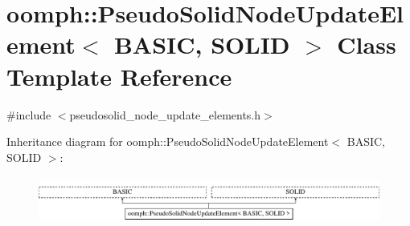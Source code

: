 \hypertarget{classoomph_1_1PseudoSolidNodeUpdateElement}{}\section{oomph\+:\+:Pseudo\+Solid\+Node\+Update\+Element$<$ B\+A\+S\+IC, S\+O\+L\+ID $>$ Class Template Reference}
\label{classoomph_1_1PseudoSolidNodeUpdateElement}


{\ttfamily \#include $<$pseudosolid\+\_\+node\+\_\+update\+\_\+elements.\+h$>$}

Inheritance diagram for oomph\+:\+:Pseudo\+Solid\+Node\+Update\+Element$<$ B\+A\+S\+IC, S\+O\+L\+ID $>$\+:\begin{figure}[H]
\begin{center}
\leavevmode
\includegraphics[height=1.586402cm]{classoomph_1_1PseudoSolidNodeUpdateElement}
\end{center}
\end{figure}
